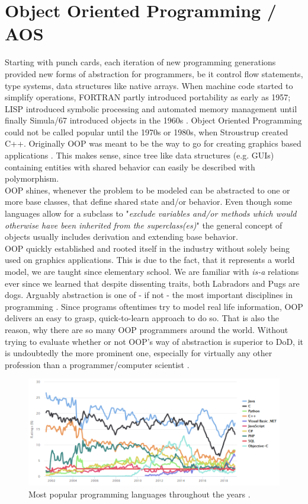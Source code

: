 \section{Object Oriented Programming / AOS}\label{OOP}
Starting with punch cards, each iteration of new programming generations provided new forms of abstraction for programmers, be it control flow statements, type systems, data structures like native arrays. When machine code started to simplify operations, FORTRAN partly introduced portability as early as 1957; LISP introduced symbolic processing and automated memory management until finally Simula/67 introduced objects in the 1960s .
Object Oriented Programming could not be called popular until the 1970s or 1980s, when Stroustrup created C++. Originally OOP was meant to be the way to go for creating graphics based applications  . This makes sense, since tree like data structures (e.g. GUIs) containing entities with shared behavior can easily be described with polymorphism.\\
OOP shines, whenever the problem to be modeled can be abstracted to one or more base classes, that define shared state and/or behavior. Even though some languages allow for a subclass to "\textit{exclude variables and/or methods which would otherwise have been inherited from the superclass(es)}"  the general concept of objects usually includes derivation and extending base behavior.\\
OOP quickly established and rooted itself in the industry without solely being used on graphics applications. This is due to the fact, that it represents a world model, we are taught since elementary school. We are familiar with \textit{is-a} relations ever since we learned that despite dissenting traits, both Labradors and Pugs are dogs. Arguably abstraction is one of - if not - the most important disciplines in programming . Since programs oftentimes try to model real life information, OOP delivers an easy to grasp, quick-to-learn approach to do so. That is also the reason, why there are so many OOP programmers around the world. Without trying to evaluate whether or not OOP's way of abstraction is superior to DoD, it is undoubtedly the more prominent one, especially for virtually any other profession than a programmer/computer scientist .
\begin{figure}[!htbp]
	\centering
	\includegraphics[width=1.0\linewidth]{PICs/lang_ratings}
	\caption{Most popular programming languages throughout the years .}\label{lang_ratings}
\end{figure}
